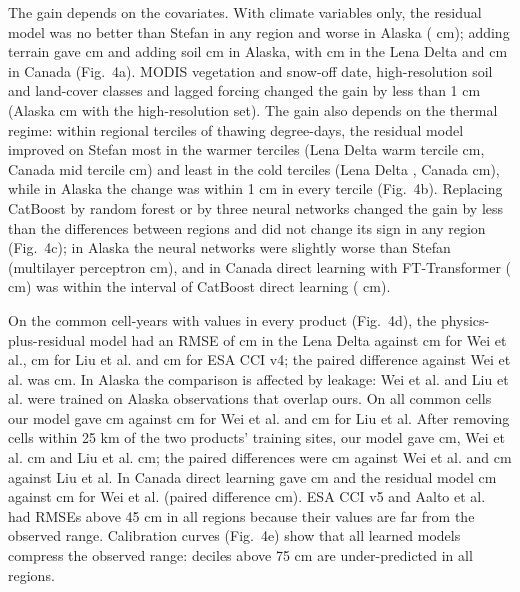 The gain depends on the covariates. With climate variables only, the residual model was no better than Stefan in any region and worse in Alaska (\ndfeatAkFclim{} cm); adding terrain gave \ndfeatAkFterr{} cm and adding soil \ndfeatAkFsoil{} cm in Alaska, with \ndfeatLeFsoil{} cm in the Lena Delta and \ndfeatCaFsoil{} cm in Canada (Fig.~4a). MODIS vegetation and snow-off date, high-resolution soil and land-cover classes and lagged forcing changed the gain by less than 1 cm (Alaska \ndfeatAkFhires{} cm with the high-resolution set). The gain also depends on the thermal regime: within regional terciles of thawing degree-days, the residual model improved on Stefan most in the warmer terciles (Lena Delta warm tercile \ndtddLewarm{} cm, Canada mid tercile \ndtddCamid{} cm) and least in the cold terciles (Lena Delta \ndtddLecold{}, Canada \ndtddCacold{} cm), while in Alaska the change was within 1 cm in every tercile (Fig.~4b). Replacing CatBoost by random forest or by three neural networks changed the gain by less than the differences between regions and did not change its sign in any region (Fig.~4c); in Alaska the neural networks were slightly worse than Stefan (multilayer perceptron \ndlrnAkmlpRo{} cm), and in Canada direct learning with FT-Transformer (\ndlrnCafttDz{} cm) was within the interval of CatBoost direct learning (\ndlrnCacatboostDz{} cm).

On the common cell-years with values in every product (Fig.~4d), the physics-plus-residual model had an RMSE of \nccLeRoall{} cm in the Lena Delta against \nccLeWeiall{} cm for Wei et al., \nccLeLiuall{} cm for Liu et al. and \nccLeCcifourall{} cm for ESA CCI v4; the paired difference against Wei et al. was \ndprodLeweiRomask{} cm. In Alaska the comparison is affected by leakage: Wei et al. and Liu et al. were trained on Alaska observations that overlap ours. On all common cells our model gave \nccAkRoall{} cm against \nccAkWeiall{} cm for Wei et al. and \nccAkLiuall{} cm for Liu et al. After removing cells within 25 km of the two products' training sites, our model gave \nccAkRomask{} cm, Wei et al. \nccAkWeimask{} cm and Liu et al. \nccAkLiumask{} cm; the paired differences were \ndprodAkweiRomask{} cm against Wei et al. and \ndprodAkliuRomask{} cm against Liu et al. In Canada direct learning gave \nccCaDzall{} cm and the residual model \nccCaRoall{} cm against \nccCaWeiall{} cm for Wei et al. (paired difference \ndprodCaweiRomask{} cm). ESA CCI v5 and Aalto et al. had RMSEs above 45 cm in all regions because their values are far from the observed range. Calibration curves (Fig.~4e) show that all learned models compress the observed range: deciles above 75 cm are under-predicted in all regions.


